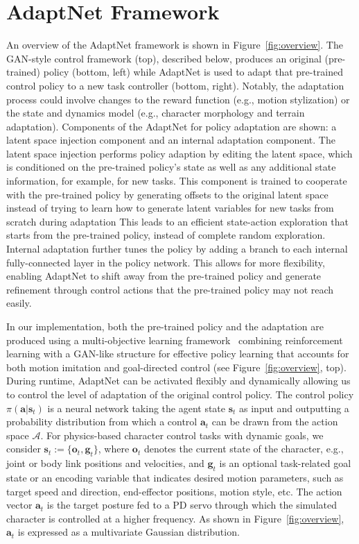 \section{AdaptNet Framework}





An overview of the AdaptNet framework is shown in Figure~\ref{fig:overview}. The GAN-style control framework (top), described below, produces an original (pre-trained) policy (bottom, left) while  
AdaptNet is used to adapt that pre-trained control policy to a new task controller (bottom, right). 
Notably, the adaptation process could involve changes to the reward function (e.g., motion stylization) or the state and dynamics model %
(e.g., character morphology and terrain adaptation).
Components of the AdaptNet for policy adaptation are shown: a latent space injection component  
and an internal adaptation component. %
The latent space injection performs %
policy adaption by editing the latent space, which is conditioned on the pre-trained policy's state as well as any additional state information, for example, for new tasks.
This component is trained to cooperate with the pre-trained policy by generating offsets to the original latent space instead of trying to learn how to generate latent variables for new tasks from scratch during adaptation
This leads to an efficient state-action exploration that starts from the pre-trained policy, instead of complete random exploration. 
Internal adaptation further tunes the policy by adding a branch to each internal fully-connected layer in the policy network.
This allows for more flexibility, enabling AdaptNet to shift away from the pre-trained policy and generate refinement through control actions that the pre-trained policy may not reach easily. 




In our implementation, both the pre-trained policy and the adaptation are produced using a multi-objective learning framework~\cite{composite} combining reinforcement learning with a GAN-like structure for effective policy learning that accounts for both motion imitation and goal-directed control (see Figure~\ref{fig:overview}, top). During runtime, AdaptNet can be activated flexibly and dynamically allowing us to control the level of adaptation of the original control policy. %
The control policy $\pi(\mathbf{a}\vert\mathbf{s}_t)$ is a 
neural network  
taking the agent state $\mathbf{s}_t$ as input and outputting a probability distribution from which a control %
$\mathbf{a}_t$ can be drawn from the action space $\mathcal{A}$. 
For physics-based character 
control tasks with dynamic goals, we consider $\mathbf{s}_t := \{\mathbf{o}_t, \mathbf{g}_t\}$, where $\mathbf{o}_t$ denotes the current state of the character, e.g., joint or body link positions and velocities, and $\mathbf{g}_t$ is an optional task-related goal state or an encoding variable that indicates 
desired motion parameters, such as target speed and direction, end-effector positions, motion style, etc.
The action vector $\mathbf{a}_t$ is %
the target posture fed to a PD servo through which the simulated character is controlled at a higher frequency. 
As shown in Figure~\ref{fig:overview}, $\mathbf{a}_t$ is expressed as a multivariate Gaussian distribution. 

